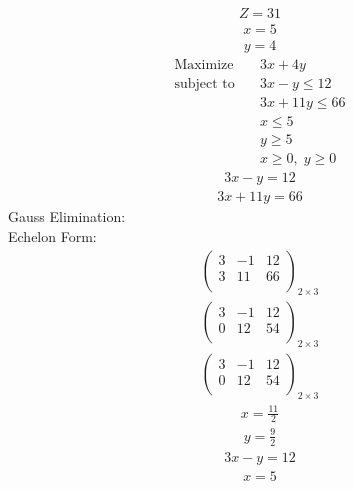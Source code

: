\documentclass{article}
\begin{document}
\begin{align*}
Z=31\end{align*}
\begin{align*}
x=5\end{align*}
\begin{align*}
y=4\end{align*}
\begin{align*}
\text{Maximize} \quad & 3x + 4y\\
\text{subject to} \quad
& 3x - y\le12\\
& 3x + 11y\le66\\
& x\le5\\
& y\ge5\\
& x\ge0,\; y\ge0\end{align*}
\begin{align*}
3x - y=12\end{align*}
\begin{align*}
3x + 11y=66\end{align*}
Gauss Elimination:\\
Echelon Form:\\
\begin{align*}
\left(
\begin{array}{cc|c}
3 & -1 & 12\\
3 & 11 & 66\\
\end{array}
\right)_{2\times 3}
\end{align*}
\begin{align*}
\left(
\begin{array}{cc|c}
3 & -1 & 12\\
0 & 12 & 54\\
\end{array}
\right)_{2\times 3}
\end{align*}
\begin{align*}
\left(
\begin{array}{cc|c}
3 & -1 & 12\\
0 & 12 & 54\\
\end{array}
\right)_{2\times 3}
\end{align*}
\begin{align*}
x=\frac{11}{2}\end{align*}
\begin{align*}
y=\frac{9}{2}\end{align*}
\begin{align*}
3x - y=12\end{align*}
\begin{align*}
x=5\end{align*}
\end{document}
